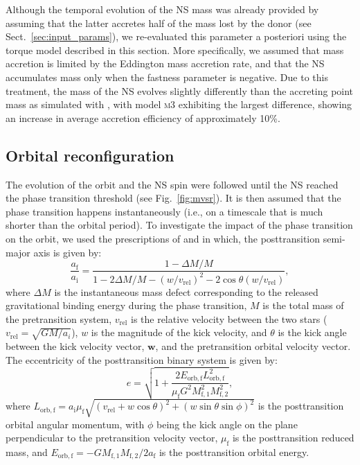 \documentclass[main.tex]{subfiles}
\begin{document}
         
         Although the temporal evolution of the NS mass was already provided by \mesa assuming that the latter accretes half of the mass lost by the donor (see Sect.~\ref{sec:input_params}), we re-evaluated this parameter a posteriori using the torque model described in this section. More specifically, we assumed that mass accretion is limited by the Eddington mass accretion rate, and that the NS accumulates mass only when the fastness parameter is negative. 
         Due to this treatment, the mass of the NS evolves slightly differently than the accreting point mass as simulated with \mesa, with model \textsc{m3} exhibiting the largest difference, showing an increase in average accretion efficiency of approximately 10\%. 
    
    \subsection{Orbital reconfiguration}\label{sec:orb_reconfig}
        The evolution of the orbit and the NS spin were followed until the NS reached the phase transition threshold (see Fig.~\ref{fig:mvsr}). It is then assumed that the phase transition happens instantaneously (i.e., on a timescale that is much shorter than the orbital period). To investigate the impact of the phase transition on the orbit, we used the prescriptions of \cite{1983apj:Hills} and \cite{Tauris:2017apj} in which,  the posttransition semi-major axis is given by:
        \begin{equation}
            \label{eq:major_axis_posttrans}
            \frac{a_\mathrm{f}}{a_\mathrm{i}} = \frac{1 - \Delta M/M}{1 - 2\Delta M/M - (w/v_\mathrm{rel})^2 - 2\cos\theta(w/v_\mathrm{rel})},
        \end{equation}
        where $\Delta M$ is the instantaneous mass defect  corresponding to the released gravitational binding energy during the phase transition, $M$ is the total mass of the pretransition system, $v_\mathrm{rel}$ is the relative velocity between the two stars ($v_\mathrm{rel} = \sqrt{GM/a_i}$), $w$ is the magnitude of the kick velocity, and $\theta$ is the kick angle between the kick velocity vector, $\textbf{w}$, and the pretransition orbital velocity vector.
        The eccentricity of the posttransition binary system is given by:
        \begin{equation}
            \label{eq:eccentricity_posttrans}
            e = \sqrt{1 + \frac{2E_\mathrm{orb,f}L_\mathrm{orb,f}^2}{\mu_\mathrm{f} G^2 M_\mathrm{f,1}^2 M_\mathrm{f,2}^2}},
        \end{equation}
        where $L_\mathrm{orb,f} = a_\mathrm{i} \mu_\mathrm{f} \sqrt{(v_\mathrm{rel} + w\cos\theta)^2 + (w\sin\theta \sin\phi)^2}$ is the posttransition orbital angular momentum, with $\phi$ being the kick angle on the plane perpendicular to the pretransition velocity vector, $\mu_\mathrm{f}$ is the posttransition reduced mass, and $E_\mathrm{orb,f} = -GM_\mathrm{f,1}M_\mathrm{f,2}/2a_\mathrm{f}$ is the posttransition orbital energy. 
        
\end{document}
